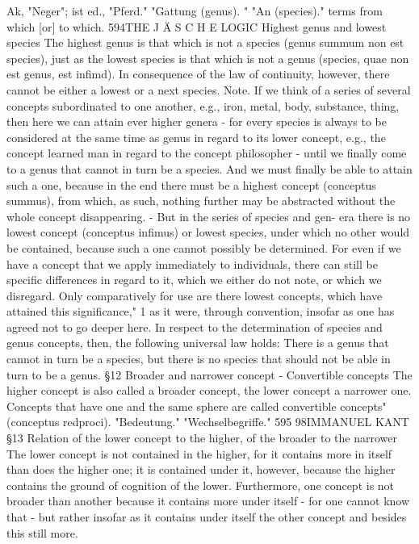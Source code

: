 Ak, "Neger"; ist ed., "Pferd."
"Gattung (genus). "
"An (species)."
terms from which [or] to which.
594THE J Ä S C H E LOGIC
Highest genus and lowest species
The highest genus is that which is not a species (genus summum non est
species), just as the lowest species is that which is not a genus (species, quae
non est genus, est infimd).
In consequence of the law of continuity, however, there cannot be
either a lowest or a next species.
Note.
If we think of a series of several concepts subordinated to one another,
e.g., iron, metal, body, substance, thing, then here we can attain ever
higher genera - for every species is always to be considered at the same
time as genus in regard to its lower concept, e.g., the concept learned man
in regard to the concept philosopher - until we finally come to a genus that
cannot in turn be a species. And we must finally be able to attain such a
one, because in the end there must be a highest concept (conceptus
summus), from which, as such, nothing further may be abstracted without
the whole concept disappearing. - But in the series of species and gen-
era there is no lowest concept (conceptus infimus) or lowest species, under
which no other would be contained, because such a one cannot possibly
be determined. For even if we have a concept that we apply immediately
to individuals, there can still be specific differences in regard to it, which
we either do not note, or which we disregard. Only comparatively for use
are there lowest concepts, which have attained this significance," 1 as it
were, through convention, insofar as one has agreed not to go deeper
here.
In respect to the determination of species and genus concepts, then, the
following universal law holds: There is a genus that cannot in turn be a species,
but there is no species that should not be able in turn to be a genus.
§12
Broader and narrower concept - Convertible concepts
The higher concept is also called a broader concept, the lower concept a
narrower one.
Concepts that have one and the same sphere are called convertible
concepts" (conceptus redproci).
"Bedeutung."
"Wechselbegriffe."
595
98IMMANUEL KANT
§13
Relation of the lower concept to the higher, of the broader
to the narrower
The lower concept is not contained in the higher, for it contains more in
itself than does the higher one; it is contained under it, however, because
the higher contains the ground of cognition of the lower.
Furthermore, one concept is not broader than another because it contains
more under itself - for one cannot know that - but rather insofar as it
contains under itself the other concept and besides this still more.
